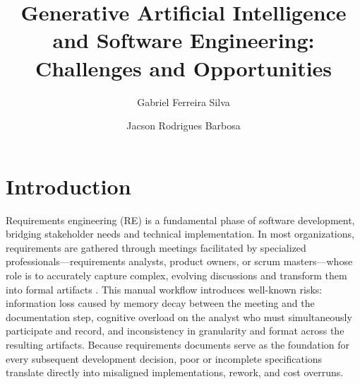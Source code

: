 \documentclass[sigconf]{acmart}
\begin{document}
\title[GenAI and Software Engineering]{Generative Artificial
Intelligence and Software Engineering: Challenges and Opportunities}

\author{Gabriel Ferreira Silva}

\author{Jacson Rodrigues Barbosa}

\renewcommand{\shortauthors}{Silva and Barbosa}
\renewcommand{\shorttitle}{GenAI and Software Engineering}

\begin{abstract}
\end{abstract}


\frenchspacing
\maketitle

\section{Introduction}
\label{sec:introduction}

Requirements engineering (RE) is a fundamental phase of software
development, bridging stakeholder needs and technical implementation.
In most organizations, requirements are gathered through meetings
facilitated by specialized professionals—requirements analysts,
product owners, or scrum masters—whose role is to accurately capture
complex, evolving discussions and transform them into formal artifacts
\cite{bokhari2011metrics}. This manual workflow introduces well-known
risks: information loss caused by memory decay between the meeting and
the documentation step, cognitive overload on the analyst who must
simultaneously participate and record, and inconsistency in granularity
and format across the resulting artifacts. Because requirements
documents serve as the foundation for every subsequent development
decision, poor or incomplete specifications translate directly into
misaligned implementations, rework, and cost overruns.
\end{document}
